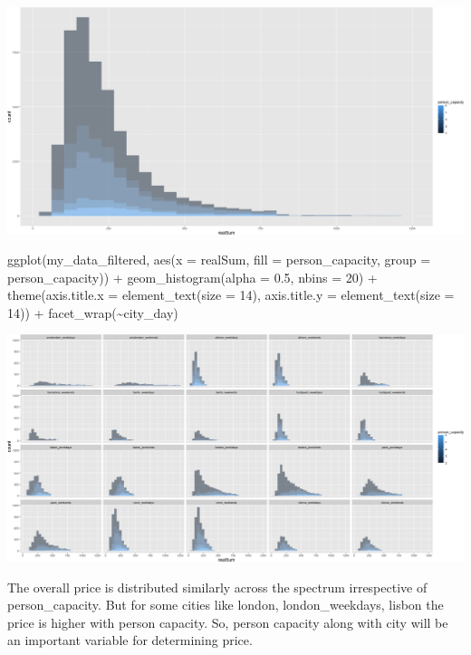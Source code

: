 \documentclass[
]{article}
\newenvironment{Shaded}{\begin{snugshade}}{\end{snugshade}}
\newcommand{\AttributeTok}[1]{\textcolor[rgb]{0.77,0.63,0.00}{#1}}
\newcommand{\DecValTok}[1]{\textcolor[rgb]{0.00,0.00,0.81}{#1}}
\newcommand{\FloatTok}[1]{\textcolor[rgb]{0.00,0.00,0.81}{#1}}
\newcommand{\FunctionTok}[1]{\textcolor[rgb]{0.00,0.00,0.00}{#1}}
\newcommand{\NormalTok}[1]{#1}
\newcommand{\SpecialCharTok}[1]{\textcolor[rgb]{0.00,0.00,0.00}{#1}}
\begin{document}
\includegraphics{Project_files/figure-latex/unnamed-chunk-19-2.png}

\begin{Shaded}
\begin{Highlighting}[]
\FunctionTok{ggplot}\NormalTok{(my\_data\_filtered, }\FunctionTok{aes}\NormalTok{(}\AttributeTok{x =}\NormalTok{ realSum, }\AttributeTok{fill =}\NormalTok{ person\_capacity,}
    \AttributeTok{group =}\NormalTok{ person\_capacity)) }\SpecialCharTok{+} \FunctionTok{geom\_histogram}\NormalTok{(}\AttributeTok{alpha =} \FloatTok{0.5}\NormalTok{, }\AttributeTok{nbins =} \DecValTok{20}\NormalTok{) }\SpecialCharTok{+}
    \FunctionTok{theme}\NormalTok{(}\AttributeTok{axis.title.x =} \FunctionTok{element\_text}\NormalTok{(}\AttributeTok{size =} \DecValTok{14}\NormalTok{), }\AttributeTok{axis.title.y =} \FunctionTok{element\_text}\NormalTok{(}\AttributeTok{size =} \DecValTok{14}\NormalTok{)) }\SpecialCharTok{+}
    \FunctionTok{facet\_wrap}\NormalTok{(}\SpecialCharTok{\textasciitilde{}}\NormalTok{city\_day)}
\end{Highlighting}
\end{Shaded}

\includegraphics{Project_files/figure-latex/unnamed-chunk-19-3.png}

The overall price is distributed similarly across the spectrum
irrespective of person\_capacity. But for some cities like london,
london\_weekdays, lisbon the price is higher with person capacity. So,
person capacity along with city will be an important variable for
determining price.
\end{document}
